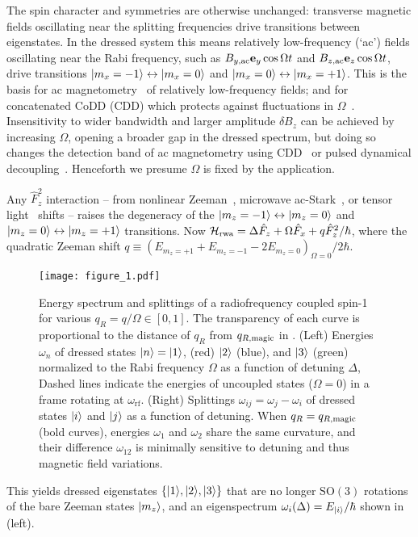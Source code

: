 \documentclass[aps,prl,reprint,superscriptaddress,floatfix]{revtex4-1}
\begin{document}
The spin character and symmetries are otherwise unchanged: transverse magnetic fields oscillating near the splitting frequencies drive transitions between eigenstates.
In the dressed system this means relatively low-frequency (`ac') fields oscillating near the Rabi frequency, such as $B_{y,\text{ac}} \mathbf{e}_y \cos \Omega t$ and $B_{z,\text{ac}} \mathbf{e}_z \cos \Omega t$, drive transitions $\vert m_x=-1 \rangle  \leftrightarrow \vert m_x=0 \rangle $ and $\vert m_x=0 \rangle  \leftrightarrow \vert m_x=+1 \rangle $.
This is the basis for ac magnetometry~\cite{hirose_continuous_2012} of relatively low-frequency fields; and for concatenated CoDD (CDD) which protects against fluctuations in $\Omega$~\cite{cai_robust_2012}.
Insensitivity to wider bandwidth and larger amplitude $\delta B_z$ can be achieved by increasing $\Omega$, opening a broader gap in the dressed spectrum, but doing so changes the detection band of ac magnetometry using CDD~\cite{loretz_radio-frequency_2013} or pulsed dynamical decoupling~\cite{boss_quantum_2017,*schmitt_submillihertz_2017}.
Henceforth we presume $\Omega$ is fixed by the application.~

Any $\hat{F}_z^2$ interaction -- from nonlinear Zeeman~\cite{ramsey_molecular_1956}, microwave ac-Stark~\cite{gerbier_resonant_2006}, or tensor light~\cite{smith_continuous_2004} shifts -- raises the degeneracy of the $\vert m_z=-1 \rangle  \leftrightarrow \vert m_z=0 \rangle $ and $\vert m_z=0 \rangle  \leftrightarrow \vert m_z=+1 \rangle $ transitions. 
Now $\mathcal{H}_{\text{rwa}} = \Delta \hat{F}_z + \Omega \hat{F}_x + q \hat{F}_z^2/\hbar$, where the quadratic Zeeman shift $q \equiv (E_{m_z=+1} + E_{m_z=-1} - 2 E_{m_z=0})_{\Omega=0}/2\hbar$.
\begin{figure}
    \texttt{[image: figure\_1.pdf]}
    \caption{
    \label{fig:eigensystem_schematic}
        Energy spectrum and splittings of a radiofrequency coupled spin-1 for various $q_R = q/\Omega \in [0,1]$.
        The transparency of each curve is proportional to the distance of $q_R$ from $q_{R,\text{magic}}$ in .
        (Left) Energies $\omega_n$ of dressed states $\vert n \rangle =\vert 1 \rangle $, (red) $\vert 2 \rangle $ (blue), and $\vert 3 \rangle $ (green) normalized to the Rabi frequency $\Omega$ as a function of detuning $\Delta$,
        Dashed lines indicate the energies of uncoupled states ($\Omega=0$) in a frame rotating at $\omega_{\text{rf}}$.
        (Right) Splittings $\omega_{ij} = \omega_j - \omega_i$ of dressed states $\vert i \rangle $ and $\vert j \rangle $ as a function of detuning.
        When $q_R=q_{R,\text{magic}}$ (bold curves), energies $\omega_1$ and $\omega_2$ share the same curvature, and their difference $\omega_{12}$ is minimally sensitive to detuning and thus magnetic field variations.
    }
\end{figure}
This yields dressed eigenstates $\{\vert 1 \rangle , \vert 2 \rangle , \vert 3 \rangle \}$ that are no longer $\text{SO}(3)$ rotations of the bare Zeeman states $\vert m_z \rangle $, and an eigenspectrum $\omega_i(\Delta) = E_{\vert i \rangle }/\hbar$ shown in  (left).
\end{document}
